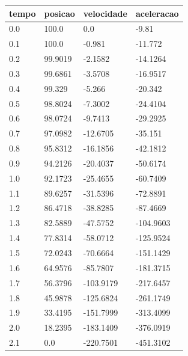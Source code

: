 \begin{tabular}{llll}
\toprule
tempo & posicao & velocidade & aceleracao \\
\midrule
0.0 & 100.0 & 0.0 & -9.81 \\
0.1 & 100.0 & -0.981 & -11.772 \\
0.2 & 99.9019 & -2.1582 & -14.1264 \\
0.3 & 99.6861 & -3.5708 & -16.9517 \\
0.4 & 99.329 & -5.266 & -20.342 \\
0.5 & 98.8024 & -7.3002 & -24.4104 \\
0.6 & 98.0724 & -9.7413 & -29.2925 \\
0.7 & 97.0982 & -12.6705 & -35.151 \\
0.8 & 95.8312 & -16.1856 & -42.1812 \\
0.9 & 94.2126 & -20.4037 & -50.6174 \\
1.0 & 92.1723 & -25.4655 & -60.7409 \\
1.1 & 89.6257 & -31.5396 & -72.8891 \\
1.2 & 86.4718 & -38.8285 & -87.4669 \\
1.3 & 82.5889 & -47.5752 & -104.9603 \\
1.4 & 77.8314 & -58.0712 & -125.9524 \\
1.5 & 72.0243 & -70.6664 & -151.1429 \\
1.6 & 64.9576 & -85.7807 & -181.3715 \\
1.7 & 56.3796 & -103.9179 & -217.6457 \\
1.8 & 45.9878 & -125.6824 & -261.1749 \\
1.9 & 33.4195 & -151.7999 & -313.4099 \\
2.0 & 18.2395 & -183.1409 & -376.0919 \\
2.1 & 0.0 & -220.7501 & -451.3102 \\
\bottomrule
\end{tabular}
